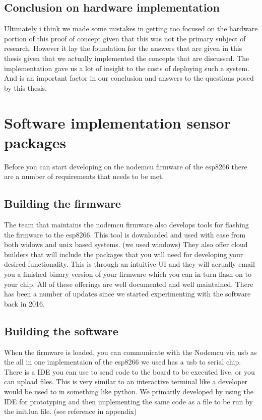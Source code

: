 \documentclass[]{uiophd}
\begin{document}
\subsection{Conclusion on hardware implementation}
Ultimately i think we made some mistakes in getting too focused on the hardware portion of this proof of concept given that this was not the primary subject of research. However it lay the foundation for the answers that are given in this thesis given that we actually implemented the concepts that are discussed. The implementation gave us a lot of insight to the costs of deploying such a system. And is an important factor in our conclusion and answers to the questions posed by this thesis.
\section{Software implementation sensor packages}
Before you can start developing on the nodemcu firmware of the esp8266 there are a number of requirements that needs to be met.
\subsection{Building the firmware}
The team that maintains the nodemcu firmware also develops tools for flashing the firmware to the esp8266. This tool is downloaded and used with ease from both widows and unix based systems. (we used windows) They also offer cloud builders that will include the packages that you will need for developing your desired functionality. This is through an intuitive UI and they will acrually email you a finished binary version of your firmware which you can in turn flash on to your chip. All of these offerings are well documented and well maintained. There has been a number of updates since we started experimenting with the software back in 2016.
\subsection{Building the software}
When the firmware is loaded, you can communicate with the Nodemcu via usb as the all in one implementaion of the esp8266 we used has a usb to serial chip. There is a IDE you can use to send code to the board to be executed live, or you can upload files. This is very similar to an interactive terminal like a developer would be used to in something like python. We primarily developed by using the IDE for prototyping and then implementing the same code as a file to be run by the init.lua file. (see reference in appendix)
\end{document}
